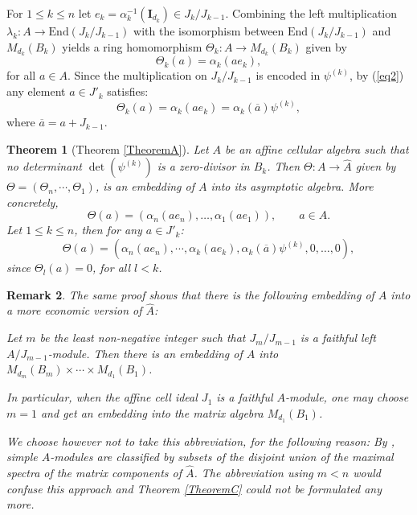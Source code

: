 \documentclass[oneside, a4paper, 11pt]{amsart}
\newtheorem{theorem}{Theorem}
\newtheorem{remark}[theorem]{Remark}
\newcommand{\asym}{\widehat{A}}
\newcommand{\End}{\mathrm{End}}
\begin{document}
\medskip

\noindent For $1\leq k \leq n$ let $e_k = \alpha_k^{-1}(\mathbf{I}_{d_k})\in J_k/J_{k-1}$. Combining the left multiplication ${\lambda_k:A\to \End(J_k/J_{k-1})}$ with the isomorphism between $\End(J_k/J_{k-1})$ and $M_{d_k}(B_k)$ yields a ring homomorphism
$\Theta_k: A \to M_{d_k}(B_k)$ given by 
\begin{equation}\Theta_k(a)=\alpha_k(ae_k),\end{equation}
for all $a\in A$. Since the multiplication on $J_k/J_{k-1}$ is encoded in $\psi^{(k)}$, by (\ref{eq2}) any element $a\in J'_k$ satisfies:
\begin{equation}\label{eq:image-theta-k}\Theta_k(a)=\alpha_k(ae_k) = \alpha_k(\overline{a})\psi^{(k)},\end{equation}
where $\overline{a} = a + J_{k-1}$.

\begin{theorem}[Theorem \ref{TheoremA}] \label{TheoremAtext}
    Let $A$ be an affine cellular algebra such that no determinant $\det(\psi^{(k)})$ is a zero-divisor in $B_k$. Then $\Theta:A\to \asym$ given by $\Theta = (\Theta_n, \cdots, \Theta_1)$, is an embedding of $A$ into its asymptotic algebra. 
    More concretely,
\begin{equation}\label{notation:embedding}
    \Theta(a) = (\alpha_n(ae_n), \ldots, \alpha_1(ae_1)), \qquad a\in A.
\end{equation}
Let $1\leq k \leq n$, then for any $a\in J'_k$:
\begin{equation}
    \Theta(a) = (\alpha_n(ae_n), \cdots, \alpha_{k}(ae_{k}), \alpha_k(\overline{a})\psi^{(k)}, 0, \ldots, 0), 
\end{equation}
since $\Theta_l(a)=0$, for all $l<k$.
\end{theorem}

\begin{remark} 
  The same proof shows that there is the following embedding
  of $A$ into a more economic version of $\asym$: 
  
  Let $m$ be the least non-negative integer such that $J_m/J_{m-1}$ is a
  faithful left $A/J_{m-1}$-module. Then there is an embedding of $A$
  into $M_{d_m}(B_m) \times \cdots \times M_{d_1}(B_1)$.
  
 In particular, when the affine cell ideal $J_1$ is a faithful $A$-module, one
 may choose $m=1$ and get an embedding into the matrix algebra
 $M_{d_1}(B_1)$.

 We choose however not to take this abbreviation, for the following
 reason: By \cite{KXaffine}, simple $A$-modules are classified by
 subsets of the disjoint union of the maximal spectra of the matrix
 components of $\asym$. The abbreviation using $m < n$ would confuse this
 approach and Theorem \ref{TheoremC} could not be formulated any more.
\end{remark}
\end{document}
